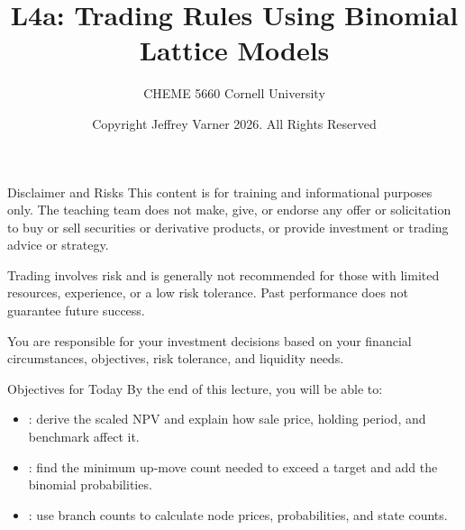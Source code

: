 \documentclass[aspectratio=169,11pt]{beamer}
\title{\texorpdfstring{{\vnheavy L4a}}{L4a}: Trading Rules Using Binomial Lattice Models}
\subtitle{CHEME 5660 Cornell University}
\author{Copyright Jeffrey Varner 2026. All Rights Reserved}
\begin{document}
\vntitlepage

\begin{frame}{Disclaimer and Risks}
  \vspace{0.6em}
  \textbf{} This content is for training and informational
  purposes only. The teaching team does not make, give, or endorse any offer or
  solicitation to buy or sell securities or derivative products, or provide
  investment or trading advice or strategy.

  \vspace{1.1em}
  \textbf{} Trading involves risk and is generally not recommended for
  those with limited resources, experience, or a low risk tolerance. Past
  performance does not guarantee future success.

  \vspace{1.1em}
  \textbf{} You are responsible for your investment decisions
  based on your financial circumstances, objectives, risk tolerance, and
  liquidity needs.
\end{frame}

\begin{frame}{Objectives for Today}
By the end of this lecture, you will be able to:

  \vspace{0.8em}
  \begin{itemize}\setlength{\itemsep}{0.8em}
    \item {}: derive the scaled NPV
      and explain how sale price, holding period, and benchmark affect it.
    \item {}: find the minimum
      up-move count needed to exceed a target and add the binomial probabilities.
    \item {}:
      use branch counts to calculate node prices, probabilities, and state counts.
  \end{itemize}
\end{frame}
\end{document}
